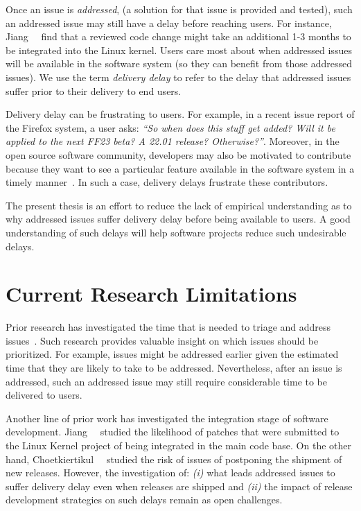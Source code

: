 Once an issue is \textit{addressed}, (\ie a solution for that issue is provided
and tested), such an addressed issue may still have a delay before reaching users.
For instance, Jiang~\etal~\cite{Jiang2013} find that a reviewed code change
might take an additional 1-3 months to be integrated into the Linux kernel.
Users care most about when addressed issues will be available in the software
system (so they can benefit from those addressed issues). We use the term
\textit{delivery delay} to refer to the delay that addressed issues suffer prior
to their delivery to end users. 

Delivery delay can be frustrating to users. For example, in a recent issue
report of the Firefox system, a user asks: \textit{``So when does this stuff get
added? Will it be applied to the next FF23 beta? A 22.01 release?
Otherwise?''}.
Moreover, in the open source software community, developers may also be
motivated to contribute because they want to see a particular feature available
in the software system in a timely manner~\cite{Jiang2013}. In such a case,
delivery delays frustrate these contributors. 

The present thesis is an effort to reduce the lack of empirical understanding as
to why addressed issues suffer delivery delay before being available to users. A
good understanding of such delays will help software projects reduce such
undesirable delays.

\section{Current Research Limitations}

Prior research has investigated the time that is needed to triage and address
issues~\cite{Anvik2005, Anbalagan2009, Giger2010, Kim2006, Marks2011, Weib2007,
Zhang2013}. Such research provides valuable insight on which issues should be
prioritized. For example, issues might be addressed earlier given the estimated
time that they are likely to take to be addressed. Nevertheless, after an issue
is addressed, such an addressed issue may still require considerable time to be
delivered to users.

Another line of prior work has investigated the integration stage of software
development. Jiang~\etal~\cite{Jiang2013} studied the likelihood of patches that
were submitted to the Linux Kernel project of being integrated in the main code
base. On the other hand,
Choetkiertikul~\etal~\cite{riskyissues2015a,riskyissues2015b} studied the risk
of issues of postponing the shipment of new releases. However, the investigation
of: {\em (i)} what leads addressed issues to suffer delivery delay even when
releases are shipped and {\em (ii)} the impact of release development strategies
on such delays remain as open challenges.

